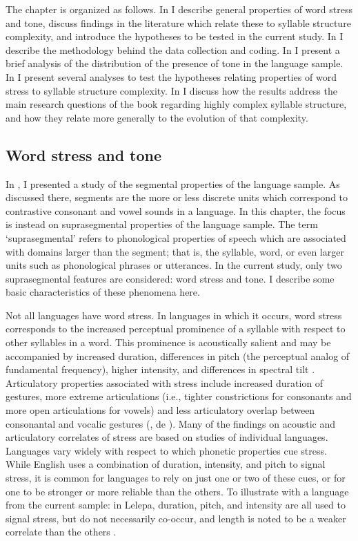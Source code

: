   The chapter is organized as follows. In  I describe general properties of word stress and tone, discuss findings in the literature which relate these to syllable structure complexity, and introduce the hypotheses to be tested in the current study. In  I describe the methodology behind the data collection and coding. In  I present a brief analysis of the distribution of the presence of tone in the language sample. In  I present several analyses to test the hypotheses relating properties of word stress to syllable structure complexity. In  I discuss how the results address the main research questions of the book regarding highly complex syllable structure, and how they relate more generally to the evolution of that complexity.

\subsection{Word stress and tone}\label{sec:5.1.1}

  In , I presented a study of the segmental properties of the language sample. As discussed there, segments are the more or less discrete units which correspond to contrastive consonant and vowel sounds in a language. In this chapter, the focus is instead on suprasegmental properties of the language sample. The term ‘suprasegmental’ refers to phonological properties of speech which are associated with domains larger than the segment; that is, the syllable, word, or even larger units such as phonological phrases or utterances. In the current study, only two suprasegmental features are considered: word stress and tone. I describe some basic characteristics of these phenomena here.

  Not all languages have word stress. In languages in which it occurs, word stress corresponds to the increased perceptual prominence of a syllable with respect to other syllables in a word. This prominence is acoustically salient and may be accompanied by increased duration, differences in pitch (the perceptual analog of fundamental frequency), higher intensity, and differences in spectral tilt \citep{Gordon2011}. Articulatory properties associated with stress include increased duration of gestures, more extreme articulations (i.e., tighter constrictions for consonants and more open articulations for vowels) and less articulatory overlap between consonantal and vocalic gestures (\citealt{BeckmanEdwards1994,Fougeron1999}, de \citealt{JongEtAl1993}). Many of the findings on acoustic and articulatory correlates of stress are based on studies of individual languages. Languages vary widely with respect to which phonetic properties cue stress. While English uses a combination of duration, intensity, and pitch to signal stress, it is common for languages to rely on just one or two of these cues, or for one to be stronger or more reliable than the others. To illustrate with a language from the current sample: in Lelepa, duration, pitch, and intensity are all used to signal stress, but do not necessarily co-occur, and length is noted to be a weaker correlate than the others \citep[58]{Lacrampe2014}.

